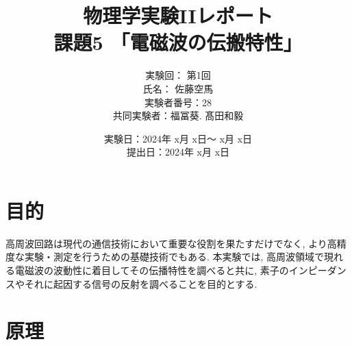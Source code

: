 \documentclass[uplatex,dvipdfmx,a4j,12pt]{jsarticle}
\title{
  物理学実験IIレポート\\    %
  課題5 「電磁波の伝搬特性」
  }
\author{
  実験回： 第1回 \\
  氏名： 佐藤空馬\\
  実験者番号：28
  \\
  共同実験者：福冨葵. 髙田和毅
  }
\date{
  実験日：2024年 x月 x日～ x月 x日 \\
  提出日：2024年 x月 x日}  %
\begin{document}
\maketitle




\vspace{5em}  


%
\begin{abstract}
\end{abstract}

\newpage


\section{目的}
高周波回路は現代の通信技術において重要な役割を果たすだけでなく, より高精度な実験・測定を行うための基礎技術でもある.
本実験では, 高周波領域で現れる電磁波の波動性に着目してその伝播特性を調べると共に, 素子のインピーダンスやそれに起因する信号の反射を調べることを目的とする.

\section{原理}
\end{document}
